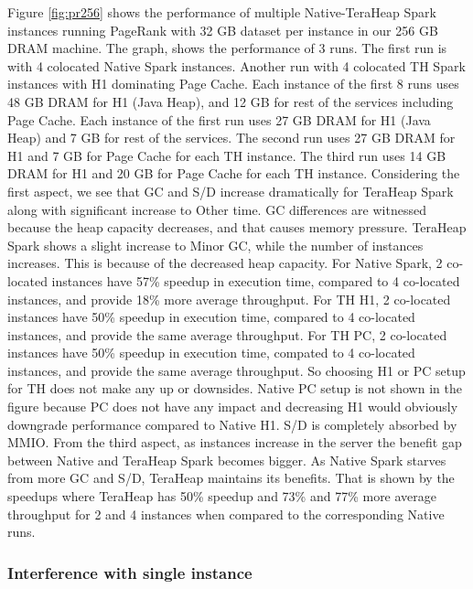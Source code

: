 Figure \ref{fig:pr256} shows the performance of multiple
Native-TeraHeap Spark instances running PageRank with 32 GB
dataset per instance in our 256 GB DRAM machine.
The graph, shows the
performance of 3 runs. The first run is with 4 colocated Native Spark instances.
Another run with 4 colocated TH Spark instances with H1 dominating Page Cache.
Each instance of the first 8 runs uses 48 GB DRAM for H1 (Java Heap), and 12 GB for rest of the services including Page Cache.
Each instance of the first run uses 27 GB DRAM for H1 (Java Heap) and 7 GB for rest of the services.
The second run uses 27 GB DRAM for H1 and 7 GB for Page Cache for each TH instance.
The third run uses 14 GB DRAM for H1 and 20 GB for Page Cache for each TH instance.
Considering the first aspect, we see that GC and S/D increase dramatically for TeraHeap Spark along with significant increase to Other time. GC differences are witnessed because the heap capacity decreases, and that causes memory pressure. TeraHeap Spark shows a slight increase to Minor GC, while the number of instances increases. This is because of the decreased heap capacity. For Native Spark, 2 co-located instances have 57\% speedup in execution time, compared to 4 co-located instances, and provide 18\% more average throughput. For TH H1, 2 co-located instances have 50\% speedup in execution time, compared to 4 co-located instances, and provide the same average throughput. For TH PC, 2 co-located instances have 50\% speedup in execution time, compated to 4 co-located instances, and provide the same average throughput. So choosing H1 or PC setup for TH does not make any up or downsides. Native PC setup is not shown in the figure because PC does not have any impact and decreasing H1 would obviously downgrade performance compared to Native H1.
S/D is completely absorbed by MMIO. From the third aspect, as instances increase in the server the benefit gap between Native and TeraHeap Spark becomes bigger. As Native Spark starves from more GC and S/D, TeraHeap maintains its benefits. That is shown by the speedups where TeraHeap has 50\% speedup and 73\% and 77\% more average throughput for 2 and 4 instances when compared to the corresponding Native runs.
\fi

\subsubsection{Interference with single instance}


